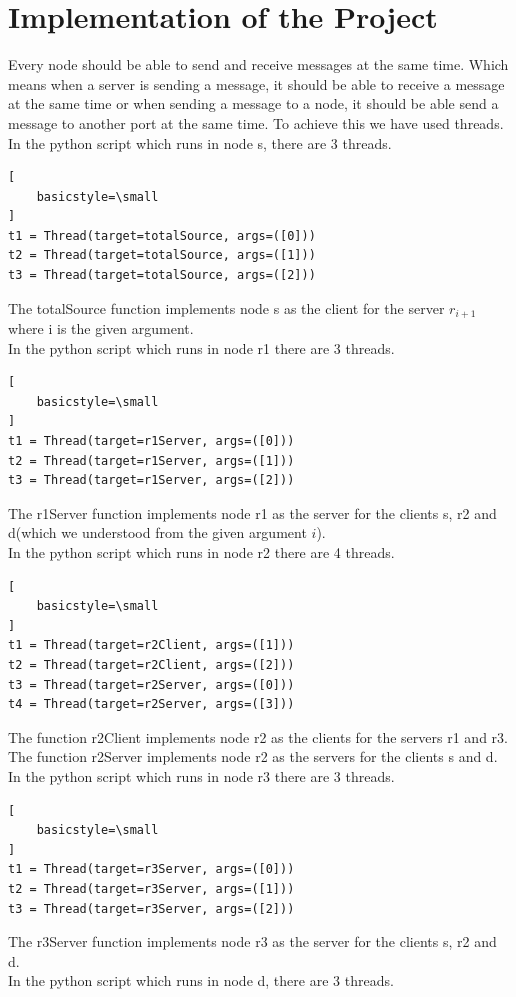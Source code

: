 \documentclass[conference]{IEEEtran}
\begin{document}
\section{Implementation of the Project}
Every node should be able to send and receive messages at the same time. Which means when a server is sending a message, it should be able to receive a message at the same time or when sending a message to a node, it should be able send a message to another port at the same time.  To achieve this we have used threads. \\
In the python script which runs in node s, there are 3 threads. 
\begin{lstlisting}[
    basicstyle=\small
]
t1 = Thread(target=totalSource, args=([0]))
t2 = Thread(target=totalSource, args=([1]))
t3 = Thread(target=totalSource, args=([2]))
\end{lstlisting}
The totalSource function implements node s as the client for the server $r_{i+1}$ where i is the given argument. \\
In the python script which runs in node r1 there are 3 threads.
\begin{lstlisting}[
    basicstyle=\small
]
t1 = Thread(target=r1Server, args=([0]))
t2 = Thread(target=r1Server, args=([1]))
t3 = Thread(target=r1Server, args=([2]))
\end{lstlisting}
The r1Server function implements node r1 as the server for the clients s, r2 and d(which we understood from the given argument $i$). \\
In the python script which runs in node r2 there are 4 threads.
\begin{lstlisting}[
    basicstyle=\small
]
t1 = Thread(target=r2Client, args=([1]))
t2 = Thread(target=r2Client, args=([2]))
t3 = Thread(target=r2Server, args=([0]))
t4 = Thread(target=r2Server, args=([3]))
\end{lstlisting}
The function r2Client implements node r2 as the clients for the servers r1 and r3. The function r2Server implements node r2 as the servers for the clients s and d. \\
In the python script which runs in node r3 there are 3 threads.
\begin{lstlisting}[
    basicstyle=\small
]
t1 = Thread(target=r3Server, args=([0]))
t2 = Thread(target=r3Server, args=([1]))
t3 = Thread(target=r3Server, args=([2]))
\end{lstlisting}
The r3Server function implements node r3 as the server for the clients s, r2 and d. \\
In the python script which runs in node d, there are 3 threads. 
\end{document}
